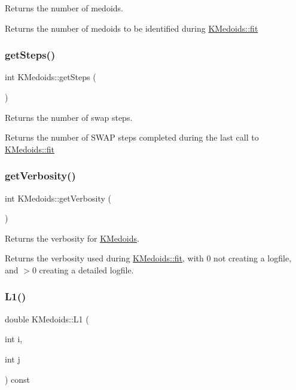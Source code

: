 Returns the number of medoids. 

Returns the number of medoids to be identified during \hyperlink{classKMedoids_ae241800e72a6b4a677333ffbf06e1798}{K\+Medoids\+::fit} \mbox{\label{classKMedoids_a2c8d55468ebe909229ea7bcdb50e8351}} 
\subsubsection{\texorpdfstring{get\+Steps()}{getSteps()}}
{\footnotesize\ttfamily int K\+Medoids\+::get\+Steps (\begin{DoxyParamCaption}{ }\end{DoxyParamCaption})}



Returns the number of swap steps. 

Returns the number of S\+W\+AP steps completed during the last call to \hyperlink{classKMedoids_ae241800e72a6b4a677333ffbf06e1798}{K\+Medoids\+::fit} \mbox{\label{classKMedoids_a8d5372adbed828602f9311dbe9c70198}} 
\subsubsection{\texorpdfstring{get\+Verbosity()}{getVerbosity()}}
{\footnotesize\ttfamily int K\+Medoids\+::get\+Verbosity (\begin{DoxyParamCaption}{ }\end{DoxyParamCaption})}



Returns the verbosity for \hyperlink{classKMedoids}{K\+Medoids}. 

Returns the verbosity used during \hyperlink{classKMedoids_ae241800e72a6b4a677333ffbf06e1798}{K\+Medoids\+::fit}, with 0 not creating a logfile, and $>$0 creating a detailed logfile. \mbox{\label{classKMedoids_a1333d47c27674c7fde7a1d557edaef3a}} 
\subsubsection{\texorpdfstring{L1()}{L1()}}
{\footnotesize\ttfamily double K\+Medoids\+::\+L1 (\begin{DoxyParamCaption}\item[{int}]{i,  }\item[{int}]{j }\end{DoxyParamCaption}) const\hspace{0.3cm}{\ttfamily [private]}}



